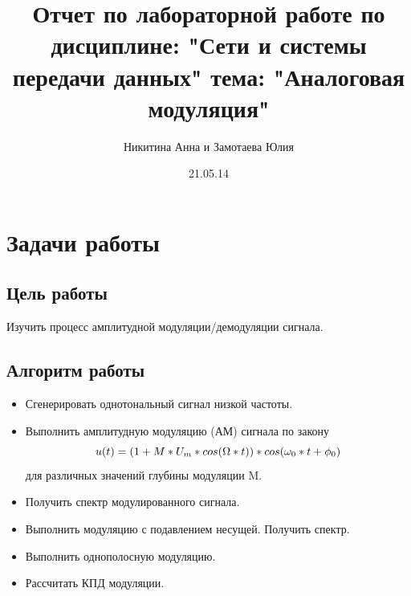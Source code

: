 \documentclass[10pt,a4paper]{report}
\author{Никитина Анна и Замотаева Юлия}
\title{Отчет по лабораторной работе по дисциплине: "Сети и системы передачи данных"\newline
тема: "Аналоговая модуляция"}
\date{21.05.14}
\begin{document}
\maketitle
\pagebreak
\chapter{Задачи работы}
\section{Цель работы}
Изучить процесс амплитудной модуляции/демодуляции сигнала.
\section{Алгоритм работы}
\begin{itemize}
\item Сгенерировать однотональный сигнал низкой частоты.
\item Выполнить амплитудную модуляцию (АМ) сигнала по закону 
\begin{displaymath}
u(t)=(1+M*U_{m}*cos(\Omega*t))*cos(\omega_{0}*t+\phi_{0})\newline
\end{displaymath}
  для различных значений глубины модуляции M.
\item Получить спектр модулированного сигнала.
\item Выполнить модуляцию с подавлением несущей. Получить спектр.
\item Выполнить однополосную модуляцию.
\item Рассчитать КПД модуляции.
\end{itemize}
\end{document}
